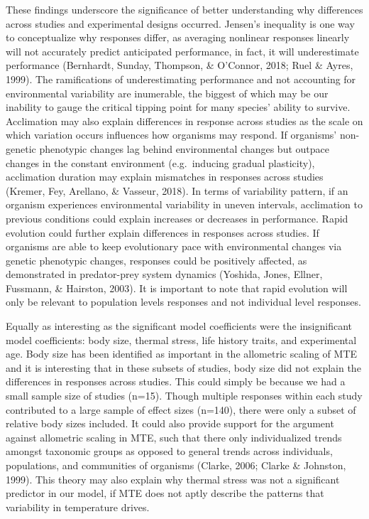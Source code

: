 \documentclass[12pt,twoside]{reedthesis}
\begin{document}
These findings underscore the significance of better understanding why differences across studies and experimental designs occurred. Jensen's inequality is one way to conceptualize why responses differ, as averaging nonlinear responses linearly will not accurately predict anticipated performance, in fact, it will underestimate performance (Bernhardt, Sunday, Thompson, \& O'Connor, 2018; Ruel \& Ayres, 1999). The ramifications of underestimating performance and not accounting for environmental variability are inumerable, the biggest of which may be our inability to gauge the critical tipping point for many species' ability to survive. Acclimation may also explain differences in response across studies as the scale on which variation occurs influences how organisms may respond. If organisms' non-genetic phenotypic changes lag behind environmental changes but outpace changes in the constant environment (e.g.~inducing gradual plasticity), acclimation duration may explain mismatches in responses across studies (Kremer, Fey, Arellano, \& Vasseur, 2018). In terms of variability pattern, if an organism experiences environmental variability in uneven intervals, acclimation to previous conditions could explain increases or decreases in performance. Rapid evolution could further explain differences in responses across studies. If organisms are able to keep evolutionary pace with environmental changes via genetic phenotypic changes, responses could be positively affected, as demonstrated in predator-prey system dynamics (Yoshida, Jones, Ellner, Fussmann, \& Hairston, 2003). It is important to note that rapid evolution will only be relevant to population levels responses and not individual level responses.

Equally as interesting as the significant model coefficients were the insignificant model coefficients: body size, thermal stress, life history traits, and experimental age. Body size has been identified as important in the allometric scaling of MTE and it is interesting that in these subsets of studies, body size did not explain the differences in responses across studies. This could simply be because we had a small sample size of studies (n=15). Though multiple responses within each study contributed to a large sample of effect sizes (n=140), there were only a subset of relative body sizes included. It could also provide support for the argument against allometric scaling in MTE, such that there only individualized trends amongst taxonomic groups as opposed to general trends across individuals, populations, and communities of organisms (Clarke, 2006; Clarke \& Johnston, 1999). This theory may also explain why thermal stress was not a significant predictor in our model, if MTE does not aptly describe the patterns that variability in temperature drives.
\end{document}
